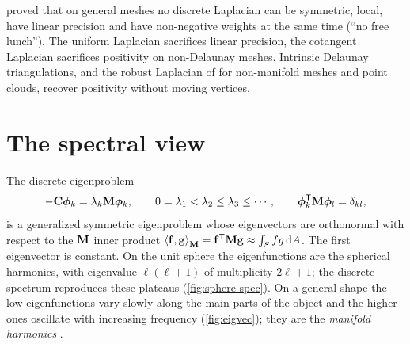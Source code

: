  proved that on general meshes no discrete Laplacian can be symmetric,
local, have linear precision and have non-negative weights at the same time (``no free lunch''). The
uniform Laplacian sacrifices linear precision, the cotangent Laplacian sacrifices positivity on
non-Delaunay meshes. Intrinsic Delaunay triangulations, and the robust Laplacian of
\citet{Sharp2020} for non-manifold meshes and point clouds, recover positivity without moving
vertices.

\section{The spectral view}

The discrete eigenproblem
\begin{equation}
-\mathbf{C}\boldsymbol{\phi}_k=\lambda_k\mathbf{M}\boldsymbol{\phi}_k,\qquad 0=\lambda_1<\lambda_2\le\lambda_3\le\cdots,\qquad
\boldsymbol{\phi}_k^{\mathsf{T}}\mathbf{M}\boldsymbol{\phi}_l=\delta_{kl},
\label{eq:geneig}
\end{equation}
is a generalized symmetric eigenproblem whose eigenvectors are orthonormal with respect to the
$\mathbf{M}$ inner product $\left\langle \mathbf{f},\mathbf{g}\right\rangle_{\mathbf{M}}=\mathbf{f}^{\mathsf{T}}\mathbf{M}\mathbf{g}\approx\int_Sfg\,\mathrm{d} A$. The first
eigenvector is constant. On the unit sphere the eigenfunctions are the spherical harmonics, with
eigenvalue $\ell(\ell+1)$ of multiplicity $2\ell+1$; the discrete spectrum reproduces these
plateaus (\cref{fig:sphere-spec}). On a general shape the low eigenfunctions vary slowly along the
main parts of the object and the higher ones oscillate with increasing frequency
(\cref{fig:eigvec}); they are the \emph{manifold harmonics} \citep{Vallet2008,Zhang2010}.



